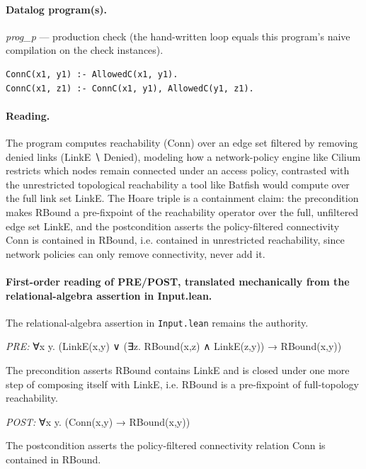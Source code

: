 \documentclass[10pt]{article}
\begin{document}
\paragraph{Datalog program(s).}

{\raggedright\textit{prog\_p} --- production check (the hand-written loop equals this program's naive compilation on the check instances).\par}

\begin{Verbatim}[fontsize=\scriptsize,breaklines=true,breakanywhere=true,frame=single,framesep=1.5mm]
ConnC(x1, y1) :- AllowedC(x1, y1).
ConnC(x1, z1) :- ConnC(x1, y1), AllowedC(y1, z1).
\end{Verbatim}

\paragraph{Reading.} The program computes reachability (Conn) over an edge set filtered by removing denied links (LinkE ∖ Denied), modeling how a network-policy engine like Cilium restricts which nodes remain connected under an access policy, contrasted with the unrestricted topological reachability a tool like Batfish would compute over the full link set LinkE. The Hoare triple is a containment claim: the precondition makes RBound a pre-fixpoint of the reachability operator over the full, unfiltered edge set LinkE, and the postcondition asserts the policy-filtered connectivity Conn is contained in RBound, i.e. contained in unrestricted reachability, since network policies can only remove connectivity, never add it.

\paragraph{First-order reading of PRE/POST, translated mechanically from the relational-algebra assertion in Input.lean.} The relational-algebra assertion in \texttt{Input.lean} remains the authority.

\textit{PRE:} ∀x y. (LinkE(x,y) ∨ (∃z. RBound(x,z) ∧ LinkE(z,y)) → RBound(x,y))\par The precondition asserts RBound contains LinkE and is closed under one more step of composing itself with LinkE, i.e. RBound is a pre-fixpoint of full-topology reachability.

\textit{POST:} ∀x y. (Conn(x,y) → RBound(x,y))\par The postcondition asserts the policy-filtered connectivity relation Conn is contained in RBound.
\end{document}
